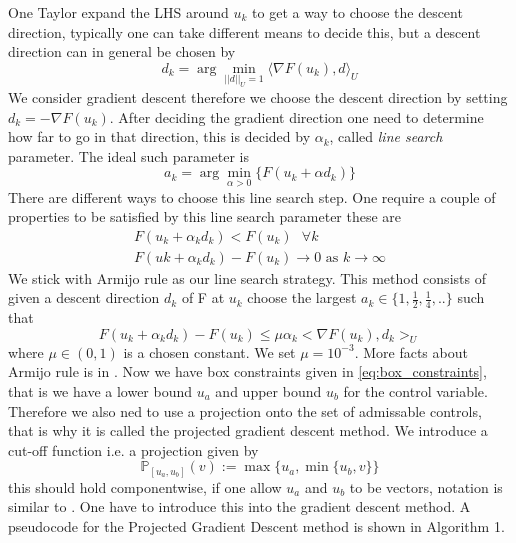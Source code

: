 One Taylor expand the LHS around $u_k$ to get a way to choose the descent direction, typically one can take different means to decide this, but a descent direction can in general be chosen by 
\begin{equation*}
    d_k = \arg\min_{||d||_U=1} \langle \nabla F(u_k), d \rangle_U
\end{equation*}
We consider gradient descent therefore we choose the descent direction by setting $d_k = -\nabla F(u_k)$. After deciding the gradient direction one need to determine how far to go in that direction, this is decided by $\alpha_k$, called \textit{line search} parameter. The ideal such parameter is 
\begin{equation*}
    a_k = \arg \min_{\alpha>0} \{ F(u_k + \alpha d_k) \}
\end{equation*}
There are different ways to choose this line search step. One require a couple of properties to be satisfied by this line search parameter these are
\begin{align*}
    F(u_k + \alpha_kd_k) < F(u_k) \text{  } \forall k \\
    F(uk + \alpha_k d_k) - F(u_k) \rightarrow 0 \text{ as } k\rightarrow \infty
\end{align*}
We stick with Armijo rule as our line search strategy. This method consists of given a descent direction $d_k$ of F at $u_k$ choose the largest $a_k \in \{ 1, \frac{1}{2},\frac{1}{4},.. \}$ such that
\begin{equation*}
    F(u_k + \alpha_kd_k) - F(u_k) \leq \mu \alpha_k <\nabla F(u_k),d_k>_U
\end{equation*}
where $\mu \in (0,1)$ is a chosen constant. We set $\mu = 10^{-3}$. More facts about Armijo rule is in \cite{numMethods}. Now we have box constraints given in \eqref{eq:box_constraints}, that is we have a lower bound $u_a$ and upper bound $u_b$ for the control variable. Therefore we also ned to use a projection onto the set of admissable controls, that is why it is called the projected gradient descent method. We introduce a cut-off function i.e. a projection given by
\begin{equation}
    \label{eq:projection}
    \mathbb{P}_{[u_a,u_b]}(v) := \max \{u_a, \min \{u_b,v \} \}
\end{equation}
this should hold componentwise, if one allow $u_a$ and $u_b$ to be vectors, notation is similar to \cite{Algorithms}. One have to introduce this into the gradient descent method. A pseudocode for the Projected Gradient Descent method is shown in Algorithm 1. 

